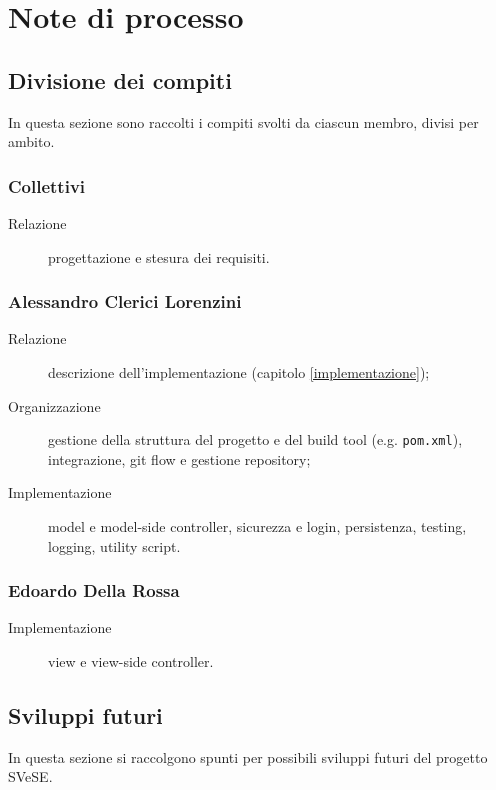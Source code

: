 \chapter{Note di processo}




\section{Divisione dei compiti}
In questa sezione sono raccolti i compiti svolti da ciascun membro, divisi per ambito.


\subsection{Collettivi}
\begin{description}
	\item[Relazione] progettazione e stesura dei requisiti.
\end{description}


\subsection{Alessandro Clerici Lorenzini}
\begin{description}
	\item[Relazione] descrizione dell'implementazione (capitolo \ref{implementazione});
	\item[Organizzazione] gestione della struttura del progetto e del build tool (e.g. \verb!pom.xml!), integrazione, git flow e gestione repository;
	\item[Implementazione] model e model-side controller, sicurezza e login, persistenza, testing, logging, utility script.
\end{description}


\subsection{Edoardo Della Rossa}
\begin{description}
	\item[Implementazione] view e view-side controller.
\end{description}




\section{Sviluppi futuri}
In questa sezione si raccolgono spunti per possibili sviluppi futuri del progetto SVeSE.


